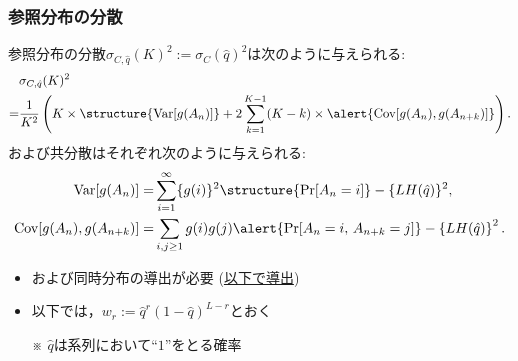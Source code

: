 \documentclass[dvipdfmx,11pt]{beamer}
\begin{document}
\begin{frame}[c]\frametitle{参照分布の分散}
\textcolor{MyGreen}{参照分布の分散}$\sigma_{C,\hat{q}}(K)^2:=\sigma_C(\hat{q})^2$は次のように与えられる:
%
\small
\begin{align*}\begin{split}
  &\sigma_{C,\hat{q}}(K)^2  \\
  =& \frac{1}{K^2} \left( K \times \structure{\mathrm{Var} [g(A_n)]} + 2\sum_{k=1}^{K-1}(K-k)\times \alert{\mathrm{Cov}[g(A_n),g(A_{n+k})]} \right).
\end{split}\end{align*}
\normalsize
%
および\alert{共分散}はそれぞれ次のように与えられる:
\small
\begin{align*}
  \mathrm{Var}[g(A_n)] =& \sum_{i=1}^{\infty} \{ g(i) \}^2 \structure{\mathrm{Pr}[A_n=i]} - \{ L H(\hat{q}) \}^2 ,\\
  \mathrm{Cov}[g(A_n),g(A_{n+k})] =& \sum_{i,j\geq 1} g(i)g(j) \alert{\mathrm{Pr}[A_n=i, \, A_{n+k}=j]}- \left\{L H(\hat{q})\right\}^2.
\end{align*}
\normalsize
%
\begin{itemize}\setlength{\itemsep}{0.5\baselineskip}
  \item {}および\alert{同時分布}の導出が必要 (\underline{以下で導出}) 
  \item 以下では，$w_r := \hat{q}^r(1 - \hat{q})^{L-r}$とおく
\end{itemize}
%
\small
\begin{itemize}
  \item[※] $\hat{q}$は系列において``$1$''をとる確率
\end{itemize}
\normalsize
%
\end{frame}
\end{document}
